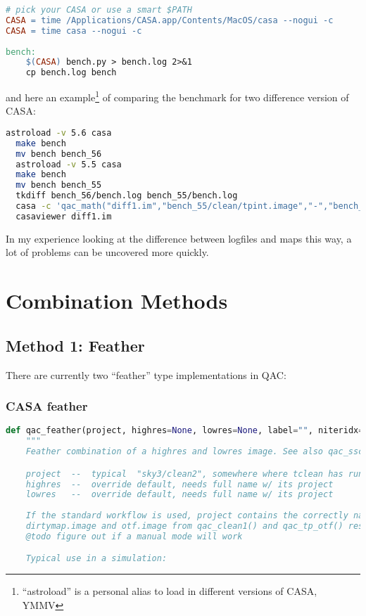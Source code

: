 \documentclass[12pt,a4paper]{article}
\begin{document}
\begin{lstlisting}[language=make]
  # pick your CASA or use a smart $PATH
CASA = time /Applications/CASA.app/Contents/MacOS/casa --nogui -c 
CASA = time casa --nogui -c
  
bench:
    $(CASA) bench.py > bench.log 2>&1
    cp bench.log bench
\end{lstlisting}

and here an example\footnote{``astroload'' is a personal alias to load in different versions of CASA, YMMV} of comparing the
benchmark for two difference version of CASA:

\begin{lstlisting}[language=bash]
  astroload -v 5.6 casa
  make bench
  mv bench bench_56
  astroload -v 5.5 casa
  make bench
  mv bench bench_55
  tkdiff bench_56/bench.log bench_55/bench.log
  casa -c 'qac_math("diff1.im","bench_55/clean/tpint.image","-","bench_56/clean/tpint.image")'
  casaviewer diff1.im
\end{lstlisting}

In my experience looking at the difference between logfiles and maps this way, a lot of problems can be uncovered more quickly.

\section{Combination Methods}

\subsection{Method 1: Feather}

There are currently two ``feather'' type implementations in QAC:

\subsubsection{CASA feather}

\begin{lstlisting}[language=Python]
def qac_feather(project, highres=None, lowres=None, label="", niteridx=0, name="dirtymap"):
    """
    Feather combination of a highres and lowres image. See also qac_ssc()

    project  --  typical  "sky3/clean2", somewhere where tclean has run
    highres  --  override default, needs full name w/ its project
    lowres   --  override default, needs full name w/ its project
    
    If the standard workflow is used, project contains the correctly named
    dirtymap.image and otf.image from qac_clean1() and qac_tp_otf() resp.
    @todo figure out if a manual mode will work

    Typical use in a simulation:
\end{lstlisting}
\end{document}
